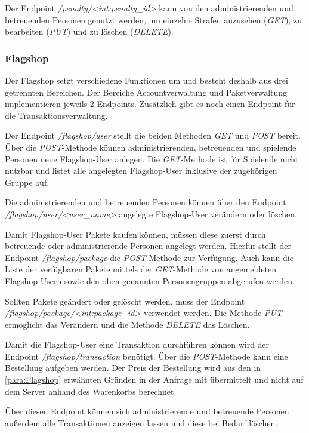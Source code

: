 Der Endpoint \textit{/penalty/<int:penalty\_id>} kann von den administrierenden und betreuenden Personen genutzt werden, um einzelne Strafen anzusehen (\textit{GET}), zu bearbeiten (\textit{PUT}) und zu löschen (\textit{DELETE}).

\subsubsection{Flagshop}
Der Flagshop setzt verschiedene Funktionen um und besteht deshalb aus drei getrennten Bereichen. Der Bereiche Accountverwaltung und Paketverwaltung implementieren jeweils 2 Endpoints. Zusätzlich gibt es noch einen Endpoint für die Transaktionsverwaltung. 

Der Endpoint \textit{/flagshop/user} stellt die beiden Methoden \textit{GET} und \textit{POST} bereit. Über die \textit{POST}-Methode können administrierenden, betreuenden und spielende Personen neue Flagshop-User anlegen. Die \textit{GET}-Methode ist für Spielende nicht nutzbar und listet alle angelegten Flagshop-User inklusive der zugehörigen Gruppe auf.

Die administrierenden und betreuenden Personen können über den Endpoint\\ \textit{/flagshop/user/<user\_name>} angelegte Flagshop-User verändern oder löschen.

Damit Flagshop-User Pakete kaufen können, müssen diese zuerst durch betreuende oder administrierende Personen angelegt werden. Hierfür stellt der Endpoint \textit{/flagshop/package} die \textit{POST}-Methode zur Verfügung. Auch kann die Liste der verfügbaren Pakete mittels der \textit{GET}-Methode von angemeldeten Flagshop-Usern sowie den oben genannten Personengruppen abgerufen werden.

Sollten Pakete geändert oder gelöscht werden, muss der Endpoint\\ \textit{/flagshop/package/<int:package\_id>} verwendet werden. Die Methode \textit{PUT} ermöglicht das Verändern und die Methode \textit{DELETE} das Löschen.

Damit die Flagshop-User eine Transaktion durchführen können wird der Endpoint \textit{/flagshop/transaction} benötigt. Über die \textit{POST}-Methode kann eine Bestellung aufgeben werden. Der Preis der Bestellung wird aus den in \autoref{para:Flagshop} erwähnten Gründen in der Anfrage mit übermittelt und nicht auf dem Server anhand des Warenkorbs berechnet.

Über diesen Endpoint können sich administrierende und betreuende Personen außerdem alle Transaktionen anzeigen lassen und diese bei Bedarf löschen.

